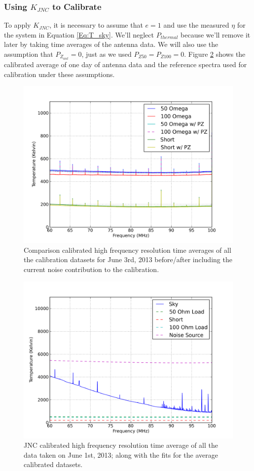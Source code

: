 \subsubsection{Using $K_{JNC}$ to Calibrate}
To apply $K_{JNC}$, it is necessary to assume that $e=1$ and use the measured $\eta$ for the system in Equation \ref{Eq:T_sky}. We'll neglect $P_{thermal}$ because we'll remove it later by taking time averages of the antenna data. We will also use the assumption that $P_{Z_{ant}} = 0$, just as we used $P_{Z50}=P_{Z100}=0$. Figure \ref{Fig:avg_JNCcal_data} shows the calibrated average of one day of antenna data and the reference spectra used for calibration under these assumptions. 

\begin{figure}[htb]
\centering
\includegraphics[width=0.85\linewidth]{Data_analysis/figures/June_03_comp_test.png}
\caption{Comparison calibrated high frequency resolution time averages of all the calibration datasets for June 3rd, 2013 before/after including the current noise contribution to the calibration. }
\label{Fig:avg_cal_comp}
\end{figure}

\begin{figure}[htb]
\centering
\includegraphics[width=0.95\linewidth]{Data_analysis/figures/June_01_mean_JNCcal_spectrum_full_ref.png}
\caption{JNC calibrated high frequency resolution time average of all the data taken on June 1st, 2013; along with the fits for the average calibrated datasets.}
\label{Fig:avg_JNCcal_data}
\end{figure}

